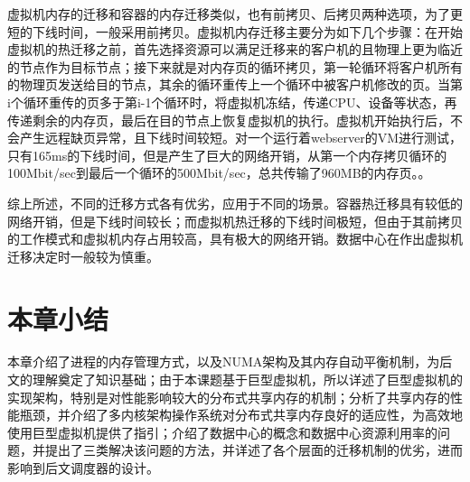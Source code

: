 虚拟机内存的迁移和容器的内存迁移类似，也有前拷贝、后拷贝两种选项，为了更短的下线时间，一般采用前拷贝。虚拟机内存迁移主要分为如下几个步骤：在开始虚拟机的热迁移之前，首先选择资源可以满足迁移来的客户机的且物理上更为临近的节点作为目标节点；接下来就是对内存页的循环拷贝，第一轮循环将客户机所有的物理页发送给目的节点，其余的循环重传上一个循环中被客户机修改的页。当第i个循环重传的页多于第i-1个循环时，将虚拟机冻结，传递CPU、设备等状态，再传递剩余的内存页，最后在目的节点上恢复虚拟机的执行。虚拟机开始执行后，不会产生远程缺页异常，且下线时间较短。对一个运行着webserver的VM进行测试，只有165ms的下线时间，但是产生了巨大的网络开销，从第一个内存拷贝循环的100Mbit/sec到最后一个循环的500Mbit/sec，总共传输了960MB的内存页。\cite{livemigration}。

综上所述，不同的迁移方式各有优劣，应用于不同的场景。容器热迁移具有较低的网络开销，但是下线时间较长；而虚拟机热迁移的下线时间极短，但由于其前拷贝的工作模式和虚拟机内存占用较高，具有极大的网络开销。数据中心在作出虚拟机迁移决定时一般较为慎重。

\section{本章小结}
本章介绍了进程的内存管理方式，以及NUMA架构及其内存自动平衡机制，为后文的理解奠定了知识基础；由于本课题基于巨型虚拟机，所以详述了巨型虚拟机的实现架构，特别是对性能影响较大的分布式共享内存的机制；分析了共享内存的性能瓶颈，并介绍了多内核架构操作系统对分布式共享内存良好的适应性，为高效地使用巨型虚拟机提供了指引；介绍了数据中心的概念和数据中心资源利用率的问题，并提出了三类解决该问题的方法，并详述了各个层面的迁移机制的优劣，进而影响到后文调度器的设计。